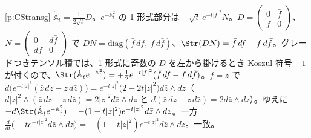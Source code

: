 \begin{sol}{\ref{p:CStransg}}
$\dot{\mathbb A}_t=\frac1{2\sqrt t}D$。$e^{-\mathbb A_t^2}$ の 1 形式部分は $-\sqrt t\,e^{-t|f|^2}N$。$D=\begin{pmatrix}0&\bar f\\f&0\end{pmatrix}$、$N=\begin{pmatrix}0&d\bar f\\df&0\end{pmatrix}$ で $DN=\mathrm{diag}(\bar f\,df,\ f\,d\bar f)$、$\Str(DN)=\bar f\,df-f\,d\bar f$。グレードつきテンソル積では、1 形式に奇数の $D$ を左から掛けるとき Koszul 符号 $-1$ が付くので、$\Str(\dot{\mathbb A}_te^{-\mathbb A_t^2})=+\frac12e^{-t|f|^2}(\bar f\,df-f\,d\bar f)$。$f=z$ で $d\bigl(e^{-t|z|^2}(\bar z\,dz-z\,d\bar z)\bigr)=e^{-t|z|^2}\bigl(2-2t|z|^2\bigr)d\bar z\wedge dz$（$d|z|^2\wedge(\bar z\,dz-z\,d\bar z)=2|z|^2d\bar z\wedge dz$ と $d(\bar z\,dz-z\,d\bar z)=2d\bar z\wedge dz$）。ゆえに $-d\Str(\dot{\mathbb A}_te^{-\mathbb A_t^2})=-(1-t|z|^2)e^{-t|z|^2}d\bar z\wedge dz$。一方 $\frac d{dt}\bigl(-te^{-t|z|^2}d\bar z\wedge dz\bigr)=-(1-t|z|^2)e^{-t|z|^2}d\bar z\wedge dz$。一致。
\end{sol}
